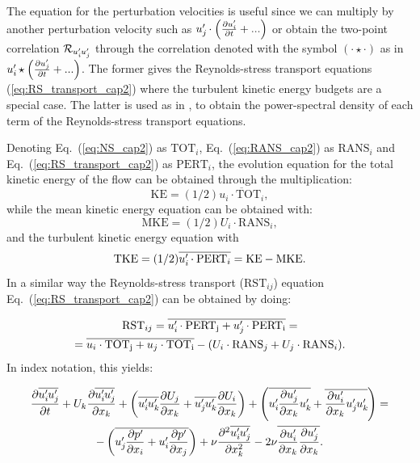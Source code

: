 The equation for the perturbation velocities is useful since we can multiply by another perturbation velocity such as $u_{j}^{\prime}\mkern-1.2mu \cdot \left( \pdv{u_{i}^{\prime}\mkern-1.2mu}{t} + ... \right) $ or obtain the two-point correlation $\mathcal{R}_{u_i^{\prime}\mkern-1.2mu u_j^{\prime}\mkern-1.2mu}$ through the correlation denoted with the symbol $(\cdot \star \cdot)$ as in $ u_{i}^{\prime}\mkern-1.2mu \star \left( \pdv{u_{j}^{\prime}\mkern-1.2mu}{t} + ... \right)$. The former gives the Reynolds-stress transport equations (\ref{eq:RS_transport_cap2}) where the turbulent kinetic energy budgets are a special case. The latter is used as in \cite{lee_moser_2019}, to obtain the power-spectral density of each term of the Reynolds-stress transport equations.

Denoting Eq.~(\ref{eq:NS_cap2}) as $\mathrm{TOT}_i$, Eq.~(\ref{eq:RANS_cap2}) as $\mathrm{RANS}_i$ and Eq.~(\ref{eq:RS_transport_cap2}) as $\mathrm{PERT}_i$, the evolution equation for the total kinetic energy of the flow can be obtained through the multiplication:
\begin{equation}
    \mathrm{KE} = (1/2) \overline{u_i \cdot \mathrm{TOT}_i}, 
\end{equation}
while the mean kinetic energy equation can be obtained with:
\begin{equation}
    \mathrm{MKE} = (1/2) U_i \cdot \mathrm{RANS}_i,
\end{equation}
and the turbulent kinetic energy equation with 
\begin{equation}
    \mathrm{TKE} = (1/2) \overline{u_i^{\prime}\mkern-1.2mu \cdot \mathrm{PERT}_i} = \mathrm{KE} - \mathrm{MKE}.
\end{equation}
In a similar way the Reynolds-stress transport ($\mathrm{RST}_{ij}$) equation Eq.~(\ref{eq:RS_transport_cap2}) can be obtained by doing: 

\begin{multline}
    \mathrm{RST}_{ij} = \overline{u_i^{\prime}\mkern-1.2mu \cdot \mathrm{PERT_j} + u_j^{\prime}\mkern-1.2mu \cdot \mathrm{PERT_i}} = \\
    = \overline{u_i \cdot \mathrm{TOT_j} + u_j \cdot \mathrm{TOT_i}} - (U_i \cdot \mathrm{RANS}_j + U_j \cdot \mathrm{RANS}_i ) .
\end{multline}
In index notation, this yields:

\begin{multline}
    \label{eq:RS_transport_cap2}
    \pdv{\overline{u_i^{\prime}\mkern-1.2muu_j^{\prime}\mkern-1.2mu}}{t} + 
    U_k\pdv{\overline{u_i^{\prime}\mkern-1.2muu_j^{\prime}\mkern-1.2mu}}{x_k} + 
    \left(
    \overline{u_i^{\prime}\mkern-1.2mu u_k^{\prime}\mkern-1.2mu}\pdv{U_j}{x_k} + \overline{u_j^{\prime}\mkern-1.2mu u_k^{\prime}\mkern-1.2mu}\pdv{U_i}{x_k}
    \right) +
    \left(
    \overline{u_i^{\prime}\mkern-1.2mu \pdv{u_j^{\prime}\mkern-1.2mu}{x_k} u_k^{\prime}\mkern-1.2mu} + \overline{\pdv{u_i^{\prime}\mkern-1.2mu}{x_k} u_j^{\prime}\mkern-1.2mu u_k^{\prime}\mkern-1.2mu}
    \right)
    = \\ 
    - \left( \overline{
    u_j^{\prime}\mkern-1.2mu \pdv{p^{\prime}\mkern-1.2mu}{x_i} + u_i^{\prime}\mkern-1.2mu \pdv{p^{\prime}\mkern-1.2mu}{x_j}
    } \right) 
    + \nu \frac{\partial^2 \overline{u_i^{\prime}\mkern-1.2mu u_j^{\prime}\mkern-1.2mu}}{\partial x_k^2} 
    - 2\nu \overline{\pdv{u_i^{\prime}\mkern-1.2mu}{x_k} \pdv{u_j^{\prime}\mkern-1.2mu}{x_k}}.
\end{multline}

